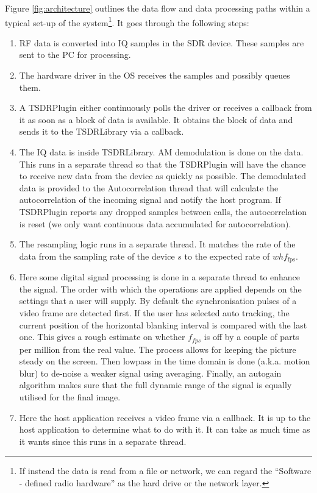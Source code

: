 \documentclass[a4paper,12pt,twoside,openright]{report}
\begin{document}
Figure \ref{fig:architecture} outlines the data flow and data processing paths within a typical set-up of the system\footnote{If instead the data is read from a file or network, we can regard the ``Software - defined radio hardware'' as the hard drive or the network layer.}. It goes through the following steps:

\begin{enumerate}
	\item RF data is converted into IQ samples in the SDR device. These samples are sent to the PC for processing.
	\item The hardware driver in the OS receives the samples and possibly queues them.
	\item A TSDRPlugin either continuously polls the driver or receives a callback from it as soon as a block of data is available. It obtains the block of data and sends it to the TSDRLibrary via a callback.
	\item The IQ data is inside TSDRLibrary. AM demodulation is done on the data. This runs in a separate thread so that the TSDRPlugin will have the chance to receive new data from the device as quickly as possible. The demodulated data is provided to the Autocorrelation thread that will calculate the autocorrelation of the incoming signal and notify the host program. If TSDRPlugin reports any dropped samples between calls, the autocorrelation is reset (we only want continuous data accumulated for autocorrelation).
	\item The resampling logic runs in a separate thread. It matches the rate of the data from the sampling rate of the device $s$ to the expected rate of $w h f_\text{fps}$.
	\item Here some digital signal processing is done in a separate thread to enhance the signal. The order with which the operations are applied depends on the settings that a user will supply. By default the synchronisation pulses of a video frame are detected first. If the user has selected auto tracking, the current position of the horizontal blanking interval is compared with the last one. This gives a rough estimate on whether $f_{fps}$ is off by a couple of parts per million from the real value. The process allows for keeping the picture steady on the screen. Then lowpass in the time domain is done (a.k.a. motion blur) to de-noise a weaker signal using averaging. Finally, an autogain algorithm makes sure that the full dynamic range of the signal is equally utilised for the final image.
	\item Here the host application receives a video frame via a callback. It is up to the host application to determine what to do with it. It can take as much time as it wants since this runs in a separate thread.

\end{enumerate}
\end{document}

